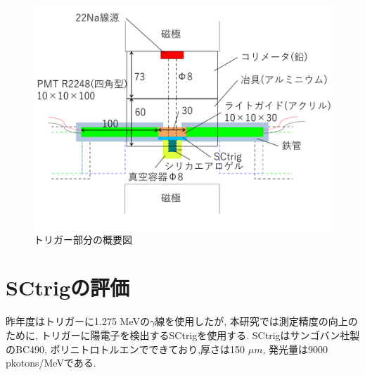 \begin{figure}[H]
\centering
\includegraphics[keepaspectratio,scale=0.4]{fig/ybm/device3.pdf}
\caption{トリガー部分の概要図}
\label{fig:device3}
\end{figure}



\section{SCtrigの評価}

昨年度はトリガーに1.275 MeVの$\gamma$線を使用したが,
本研究では測定精度の向上のために,
トリガーに陽電子を検出するSCtrigを使用する.
SCtrigはサンゴバン社製のBC490,
ポリニトロトルエンでできており,厚さは150 $\si{\mu m}$,
発光量は9000 pkotons/MeVである.

